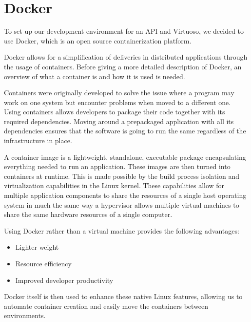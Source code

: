 \section{Docker}
To set up our development environment for an API and Virtuoso, we decided to use Docker, which is an open source containerization platform.

Docker allows for a simplification of deliveries in distributed applications through the usage of containers\cite{Container_Docker}. 
Before giving a more detailed description of Docker, an overview of what a container is and how it is used is needed. 


Containers were originally developed to solve the issue where a program may work on one system but encounter problems when moved to a different one. 
Using containers allows developers to package their code together with its required dependencies. 
Moving around a prepackaged application with all its dependencies ensures that the software is going to run the same regardless of the infrastructure in place\cite{Container_Docker}.


A container image is a lightweight, standalone, executable package encapsulating everything needed to run an application. 
These images are then turned into containers at runtime.
This is made possible by the build process isolation and virtualization capabilities in the Linux kernel. 
These capabilities allow for multiple application components to share the resources of a single host operating system in much the same way a hypervisor allows multiple virtual machines to share the same hardware resources of a single computer\cite{Container_Docker}.


Using Docker rather than a virtual machine provides the following advantages:

\begin{itemize}
    \item Lighter weight
    \item Resource efficiency
    \item Improved developer productivity
\end{itemize}

Docker itself is then used to enhance these native Linux features, allowing us to automate container creation and easily move the containers between environments\cite{Docker_IBM}.